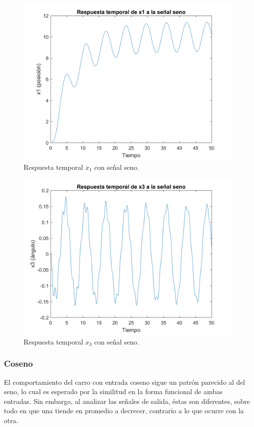\documentclass[journal]{IEEEtran}
\begin{document}
\begin{figure}[ht!]
\caption{Respuesta temporal $x_1$ con señal seno.\label{x1seno}}
  \centering
\includegraphics[scale=0.18]{figures/x1seno.png}
\end{figure}

\begin{figure}[ht!]
\caption{Respuesta temporal $x_3$ con señal seno.\label{x3seno}}
  \centering
\includegraphics[scale=0.18]{figures/x3seno.png}
\end{figure}

\subsubsection*{Coseno}
El comportamiento del carro con entrada coseno sigue un patrón parecido al del seno, lo cual es esperado por la similitud en la forma funcional de ambas entradas. Sin embargo, al analizar las señales de salida, éstas son diferentes, sobre todo en que una tiende en promedio a decrecer, contrario a lo que ocurre con la otra.\\
\end{document}
